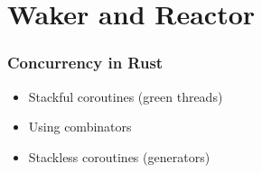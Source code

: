 \section{Waker and Reactor} %
\begin{frame}[fragile]
    \frametitle{Concurrency in Rust}
% 
% 
% 
% 
    \begin{itemize}
        \item Stackful coroutines (green threads)
        \item Using combinators
        \item Stackless coroutines (generators)
    \end{itemize}
% 
\end{frame}
